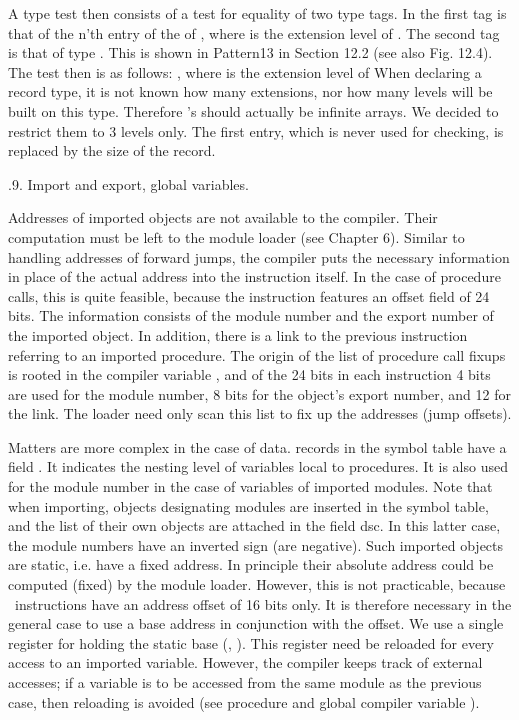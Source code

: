 A type test then consists of a test for equality of two type tags. In  the first tag is that of the n’th entry of the  of , where  is the extension level of . The second tag is that of type . This is shown in Pattern13 in Section 12.2 (see also Fig. 12.4). The test then is as follows:
\medskip
{}, where  is the extension level of 
\medskip
When declaring a record type, it is not known how many extensions, nor how many levels will be built on this type. Therefore ’s should actually be infinite arrays. We decided to restrict them to 3 levels only. The first entry, which is never used for checking, is replaced by the size of the record.

.9. Import and export, global variables.

Addresses of imported objects are not available to the compiler. Their computation must be left to the module loader (see Chapter 6). Similar to handling addresses of forward jumps, the compiler puts the necessary information in place of the actual address into the instruction itself. In the case of procedure calls, this is quite feasible, because the  instruction features an offset field of 24 bits. The information consists of the module number and the export number of the imported object. In addition, there is a link to the previous instruction referring to an imported procedure. The origin of the list of procedure call fixups is rooted in the compiler variable , and of the 24 bits in each  instruction 4 bits are used for the module number, 8 bits for the object's export number, and 12 for the link. The loader need only scan this list to fix up the addresses (jump offsets).

Matters are more complex in the case of data.  records in the symbol table have a field . It indicates the nesting level of variables local to procedures. It is also used for the module number in the case of variables of imported modules. Note that when importing, objects designating modules are inserted in the symbol table, and the list of their own objects are attached in the field dsc. In this latter case, the module numbers have an inverted sign (are negative). Such imported objects are static, i.e. have a fixed address. In principle their absolute address could be computed (fixed) by the module loader. However, this is not practicable, because \RISC\ instructions have an address offset of 16 bits only. It is therefore necessary in the general case to use a base address in conjunction with the offset. We use a single register for holding the static base (, ). This register need be reloaded for every access to an imported variable. However, the compiler keeps track of external accesses; if a variable is to be accessed from the same module as the previous case, then reloading is avoided (see procedure  and global compiler variable ).

